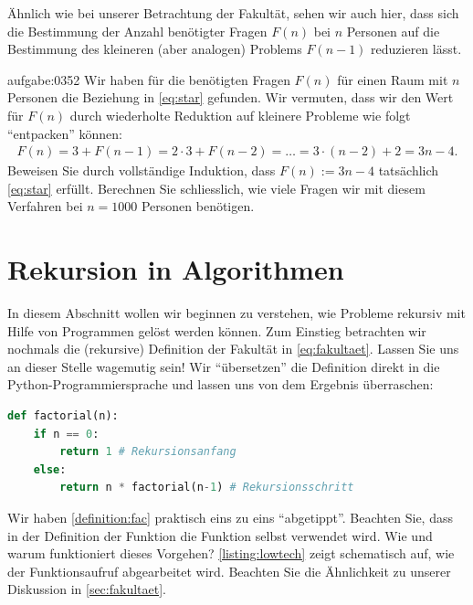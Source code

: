 Ähnlich wie bei unserer Betrachtung der Fakultät, sehen wir auch hier, dass sich die Bestimmung der Anzahl benötigter Fragen $F(n)$ bei $n$ Personen auf die Bestimmung des kleineren (aber analogen) Problems $F(n-1)$ reduzieren lässt.
\begin{aufgabe}{aufgabe:0352}
Wir haben für die benötigten Fragen $F(n)$ für einen Raum mit $n$ Personen die Beziehung in \cref{eq:star} gefunden. Wir vermuten, dass wir den Wert für $F(n)$ durch wiederholte Reduktion auf kleinere Probleme wie folgt \enquote{entpacken} können:
\begin{align*}
    F(n) = 3 + F(n-1) = 2\cdot 3 + F(n-2) = \ldots = 3\cdot (n-2) + 2 = 3n - 4.
\end{align*}
Beweisen Sie durch vollständige Induktion, dass $F(n) := 3n - 4$ tatsächlich \cref{eq:star} erfüllt. Berechnen Sie schliesslich, wie viele Fragen wir mit diesem Verfahren bei $n = 1000$ Personen benötigen.
\end{aufgabe}

\clearpage
\section{Rekursion in Algorithmen}
In diesem Abschnitt wollen wir beginnen zu verstehen, wie Probleme rekursiv mit Hilfe von Programmen gelöst werden können. Zum Einstieg betrachten wir nochmals die (rekursive) Definition der Fakultät in \cref{eq:fakultaet}. Lassen Sie uns an dieser Stelle wagemutig sein! Wir \enquote{übersetzen} die Definition direkt in die Python-Programmiersprache und lassen uns von dem Ergebnis überraschen:
\begin{lstlisting}[language=Python,caption=rekursive Fakultäts-Funktion]
def factorial(n):
    if n == 0:
        return 1 # Rekursionsanfang
    else:
        return n * factorial(n-1) # Rekursionsschritt
\end{lstlisting}
Wir haben \cref{definition:fac} praktisch eins zu eins \enquote{abgetippt}. Beachten Sie, dass in der Definition der Funktion  die Funktion  selbst verwendet wird. Wie und warum funktioniert dieses Vorgehen? \cref{listing:lowtech} zeigt schematisch auf, wie der Funktionsaufruf  abgearbeitet wird. Beachten Sie die Ähnlichkeit zu unserer Diskussion in \cref{sec:fakultaet}. 

